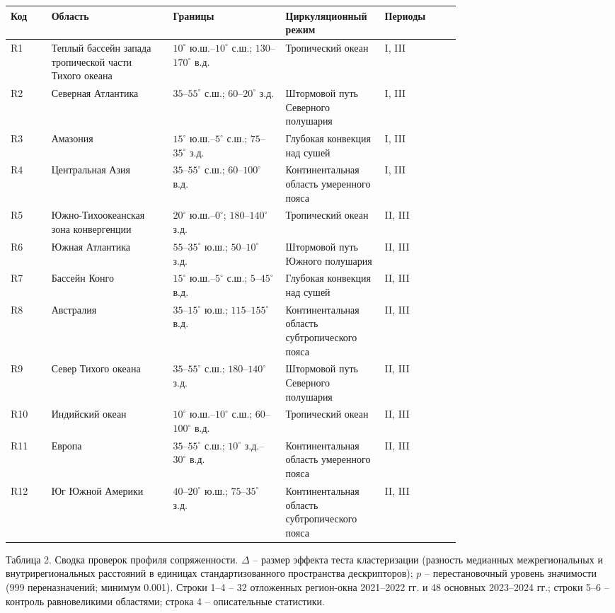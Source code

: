 \documentclass[12pt,a4paper]{article}
\begin{document}
\begin{singlespace}
\noindent\begin{tabular}{@{}l>{\raggedright\arraybackslash}p{0.27\linewidth}>{\raggedright\arraybackslash}p{0.25\linewidth}>{\raggedright\arraybackslash}p{0.22\linewidth}l@{}}
\toprule
Код & Область & Границы & Циркуляционный режим & Периоды\\
\midrule
R1 & Теплый бассейн запада тропической части Тихого океана & $10^\circ$ ю.ш.--$10^\circ$ с.ш.; $130$--$170^\circ$ в.д. & Тропический океан & I, III\\
R2 & Северная Атлантика & $35$--$55^\circ$ с.ш.; $60$--$20^\circ$ з.д. & Штормовой путь Северного полушария & I, III\\
R3 & Амазония & $15^\circ$ ю.ш.--$5^\circ$ с.ш.; $75$--$35^\circ$ з.д. & Глубокая конвекция над сушей & I, III\\
R4 & Центральная Азия & $35$--$55^\circ$ с.ш.; $60$--$100^\circ$ в.д. & Континентальная область умеренного пояса & I, III\\
R5 & Южно-Тихоокеанская зона конвергенции & $20^\circ$ ю.ш.--$0^\circ$; $180$--$140^\circ$ з.д. & Тропический океан & II, III\\
R6 & Южная Атлантика & $55$--$35^\circ$ ю.ш.; $50$--$10^\circ$ з.д. & Штормовой путь Южного полушария & II, III\\
R7 & Бассейн Конго & $15^\circ$ ю.ш.--$5^\circ$ с.ш.; $5$--$45^\circ$ в.д. & Глубокая конвекция над сушей & II, III\\
R8 & Австралия & $35$--$15^\circ$ ю.ш.; $115$--$155^\circ$ в.д. & Континентальная область субтропического пояса & II, III\\
R9 & Север Тихого океана & $35$--$55^\circ$ с.ш.; $180$--$140^\circ$ з.д. & Штормовой путь Северного полушария & II, III\\
R10 & Индийский океан & $10^\circ$ ю.ш.--$10^\circ$ с.ш.; $60$--$100^\circ$ в.д. & Тропический океан & II, III\\
R11 & Европа & $35$--$55^\circ$ с.ш.; $10^\circ$ з.д.--$30^\circ$ в.д. & Континентальная область умеренного пояса & II, III\\
R12 & Юг Южной Америки & $40$--$20^\circ$ ю.ш.; $75$--$35^\circ$ з.д. & Континентальная область субтропического пояса & II, III\\
\bottomrule
\end{tabular}
\end{singlespace}

\clearpage
\noindent Таблица 2. Сводка проверок профиля сопряженности. $\Delta$ -- размер эффекта теста кластеризации (разность медианных межрегиональных и внутрирегиональных расстояний в единицах стандартизованного пространства дескрипторов); $p$ -- перестановочный уровень значимости (999 переназначений; минимум 0.001). Строки 1--4 -- 32 отложенных регион-окна 2021--2022 гг. и 48 основных 2023--2024 гг.; строки 5--6 -- контроль равновеликими областями; строка 4 -- описательные статистики.
\end{document}

